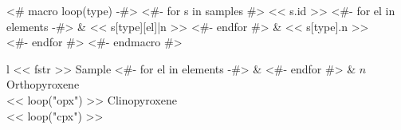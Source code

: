 <# macro loop(type) -#>
  <#- for s in samples #>
    << s.id >>
    <#- for el in elements -#>
    & << s[type][el]|n >>
    <#- endfor #> & << s[type].n >> \\
  <#- endfor #>
<#- endmacro #>
\begin{tabular}{l << fstr >>}
\hline
  Sample
  <#- for el in elements -#>
  & 
  <#- endfor #> & $n$ \\
\hline
Orthopyroxene \\
\hline
<< loop("opx") >>
\hline
Clinopyroxene \\
\hline
<< loop("cpx") >>
\hline
\end{tabular}


